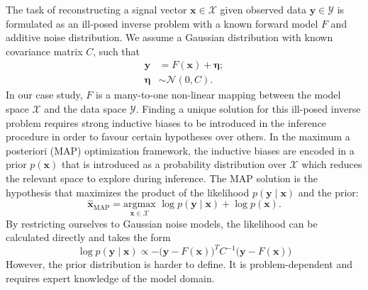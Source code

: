 The task of reconstructing a signal vector $\mathbf{x} \in \mathcal{X}$ given 
observed data $\mathbf{y} \in \mathcal{Y}$ is formulated as an ill-posed inverse 
problem with a known forward model $F$ and additive noise distribution. 
We assume a Gaussian distribution with known covariance matrix $C$, 
such that
\begin{equation}\label{eq:MainEquation} 
\begin{aligned}
        \mathbf{y} &= F(\mathbf{x}) + \boldsymbol{\eta};\\[2pt]
        \boldsymbol{\eta} &\sim \mathcal{N}(0, C).
\end{aligned}
\end{equation} 
In our case study, $F$ is a many-to-one non-linear 
mapping between the model space $\mathcal{X}$ 
and the data space $\mathcal{Y}$. 
Finding a unique solution for this ill-posed inverse problem 
requires strong inductive biases to be introduced in the inference procedure 
in order to favour certain hypotheses over others. 
In the maximum a posteriori (MAP)
optimization framework, the inductive biases are encoded in a prior 
$p(\mathbf{x})$ that is introduced as a
probability distribution over $\mathcal{X}$ which reduces the 
relevant space to explore during inference. The MAP solution 
is the hypothesis that maximizes the product of the likelihood $p(\mathbf{y} \mid \mathbf{x})$ 
and the prior:
\begin{equation}\label{eq:Posterior} 
        \hat{\mathbf{x}}_{\mathrm{MAP}} = \underset{\mathbf{x} \in \mathcal{X}}{ \mathrm{argmax}}\,\,
        \log p(\mathbf{y} \mid \mathbf{x}) + \log p(\mathbf{x}).
\end{equation} 
By restricting ourselves to Gaussian noise models, the likelihood 
can be calculated directly and takes the form
\begin{equation}\label{eq:Likelihood} 
        \log p(\mathbf{y} \mid \mathbf{x}) \propto -
        \big(\mathbf{y} - F(\mathbf{x})\big)^{T} C^{-1} \big(\mathbf{y} - F(\mathbf{x})\big)
\end{equation} 
However, the prior distribution is harder to define. 
It is problem-dependent and requires 
expert knowledge of the model domain. 


